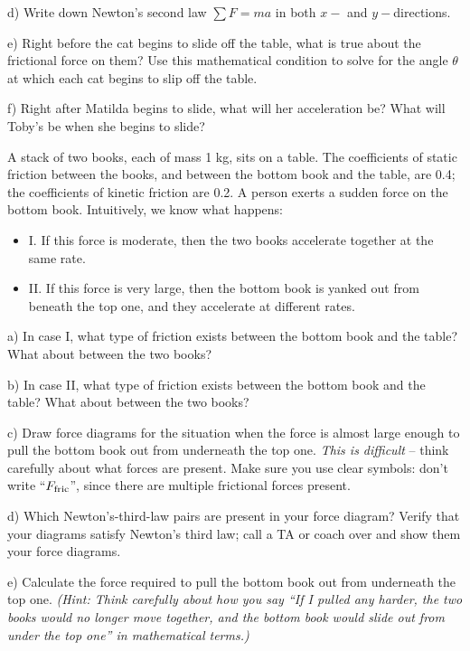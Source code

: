 \documentclass[12pt]{article}
\begin{document}
d) Write down Newton's second law $\sum F = ma$ in both $x-$ and $y-$directions. 

\vspace{2in}
\newpage

e) Right before the cat begins to slide off the table, what is true about the frictional force on them? Use this 
mathematical condition to solve for the angle $\theta$ at which each cat begins to slip off the table.

\vspace{3in}

f) Right after Matilda begins to slide, what will her acceleration be? What will Toby's be when she begins to slide? 



\newpage

		
		A stack of two books, each of mass 1 kg, sits on a table. The coefficients of static friction between the books, and between the bottom book and the table, are 0.4; the coefficients of kinetic friction are 0.2. A person exerts a sudden force on the bottom book. Intuitively, we know what happens:
		\begin{itemize}
			\item{I. If this force is moderate, then the two books accelerate together at the same rate.}
			\item{II. If this force is very large, then the bottom book is yanked out from beneath the top one, and they accelerate at different rates.}
		\end{itemize}
		
		a) In case I, what type of friction exists between the bottom book and the table? What about between the two books?
		
		\vspace{0.5in}
		
		b) In case II, what type of friction exists between the bottom book and the table? What about between the two books?
		
		\vspace{0.5in}
		
		c) Draw force diagrams for the situation when the force is almost large enough to pull the bottom book out from underneath the top one. {\it This is difficult} -- think carefully about what forces are present. Make sure you use clear symbols: don't write ``$F_{\rm fric}$'', since there are multiple frictional forces present.
		
		\vspace{2.3in}
		
		d) Which Newton's-third-law pairs are present in your force diagram? Verify that your diagrams satisfy Newton's third law; call a TA or coach over and show them your force diagrams.
		
		\newpage
		
		e) Calculate the force required to pull the bottom book out from underneath the top one. {\it (Hint: Think carefully about how you say ``If I pulled any harder, the two books would no longer move together, and the bottom book would slide out from under the top one'' in mathematical terms.)}
		

	
\end{document}

